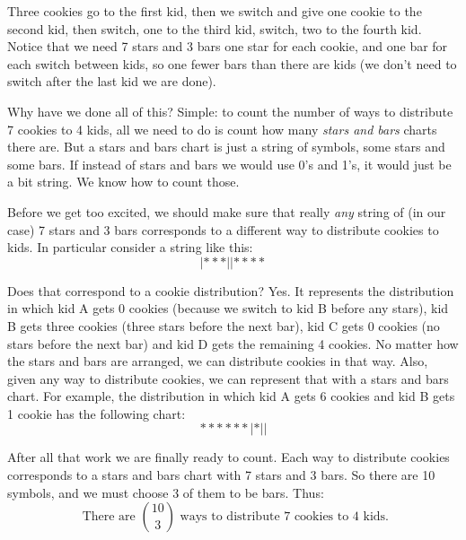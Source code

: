 \documentclass[10pt,]{book}
\theoremstyle{plain}
\theoremstyle{definition}
\theoremstyle{definition}
\theoremstyle{definition}
\numberwithin{equation}{section}
\begin{document}
Three cookies go to the first kid, then we switch and give one cookie to the second kid, then switch, one to the third kid, switch, two to the fourth kid. Notice that we need 7 stars and 3 bars \textendash{} one star for each cookie, and one bar for each switch between kids, so one fewer bars than there are kids (we don't need to switch after the last kid \textendash{} we are done).
%
\par

Why have we done all of this? Simple: to count the number of ways to distribute 7 cookies to 4 kids, all we need to do is count how many \emph{stars and bars} charts there are. But a stars and bars chart is just a string of symbols, some stars and some bars. If instead of stars and bars we would use 0's and 1's, it would just be a bit string. We know how to count those.
%
\par

Before we get too excited, we should make sure that really \emph{any} string of (in our case) 7 stars and 3 bars corresponds to a different way to distribute cookies to kids. In particular consider a string like this:
\begin{equation*}
  |***||****
\end{equation*}
%
\par

Does that correspond to a cookie distribution? Yes. It represents the distribution in which kid A gets 0 cookies (because we switch to kid B before any stars), kid B gets three cookies (three stars before the next bar), kid C gets 0 cookies (no stars before the next bar) and kid D gets the remaining 4 cookies. No matter how the stars and bars are arranged, we can distribute cookies in that way. Also, given any way to distribute cookies, we can represent that with a stars and bars chart. For example, the distribution in which kid A gets 6 cookies and kid B gets 1 cookie has the following chart:
\begin{equation*}
  ******|*||
\end{equation*}
%
\par

After all that work we are finally ready to count. Each way to distribute cookies corresponds to a stars and bars chart with 7 stars and 3 bars. So there are 10 symbols, and we must choose 3 of them to be bars. Thus:
\begin{equation*}
  \mbox{ There are } {10 \choose 3}\mbox{ ways to distribute 7 cookies to 4 kids.}
\end{equation*}
%
\par
\end{document}
